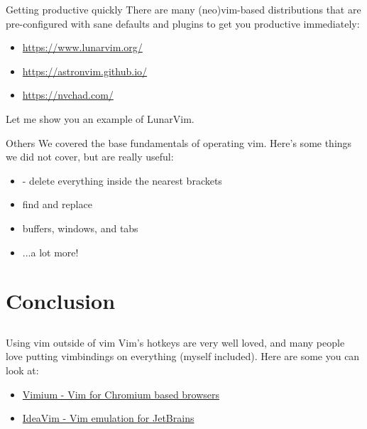 \documentclass[12pt]{beamer}
\begin{document}
\begin{frame}{Getting productive quickly}
  There are many (neo)vim-based distributions that are pre-configured with sane defaults and plugins to get you productive immediately:

  \begin{itemize}
    \item \url{https://www.lunarvim.org/}
    \item \url{https://astronvim.github.io/}
    \item \url{https://nvchad.com/}
  \end{itemize}

  Let me show you an example of LunarVim.
\end{frame}{}

\begin{frame}{Others}
    We covered the base fundamentals of operating vim. Here's some things we did not cover, but are really
    useful:

    \begin{itemize}
        \item {} - delete everything inside the nearest brackets
        \item find and replace
        \item buffers, windows, and tabs
        \item ...a lot more!
    \end{itemize}{}
\end{frame}{}

\section{Conclusion}
\subsection{}


\begin{frame}{Using vim outside of vim}
    Vim's hotkeys are very well loved, and many people love putting vimbindings on everything (myself included).
    Here are some you can look at:

    \begin{itemize}
      \item \href{https://chrome.google.com/webstore/detail/vimium/dbepggeogbaibhgnhhndojpepiihcmeb?hl=en}{Vimium - Vim for Chromium based browsers}
      \item \href{https://plugins.jetbrains.com/plugin/164-ideavim}{IdeaVim - Vim emulation for JetBrains}
    \end{itemize}{}
\end{frame}{}
\end{document}
